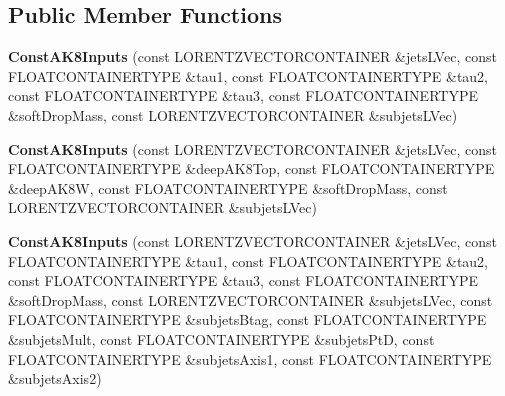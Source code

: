 \subsection*{Public Member Functions}
\begin{DoxyCompactItemize}
\item 
\hypertarget{classttUtility_1_1ConstAK8Inputs_a9b57ae3e1d2882c7c4cc517dd398139b}{{\bfseries Const\-A\-K8\-Inputs} (const L\-O\-R\-E\-N\-T\-Z\-V\-E\-C\-T\-O\-R\-C\-O\-N\-T\-A\-I\-N\-E\-R \&jets\-L\-Vec, const F\-L\-O\-A\-T\-C\-O\-N\-T\-A\-I\-N\-E\-R\-T\-Y\-P\-E \&tau1, const F\-L\-O\-A\-T\-C\-O\-N\-T\-A\-I\-N\-E\-R\-T\-Y\-P\-E \&tau2, const F\-L\-O\-A\-T\-C\-O\-N\-T\-A\-I\-N\-E\-R\-T\-Y\-P\-E \&tau3, const F\-L\-O\-A\-T\-C\-O\-N\-T\-A\-I\-N\-E\-R\-T\-Y\-P\-E \&soft\-Drop\-Mass, const L\-O\-R\-E\-N\-T\-Z\-V\-E\-C\-T\-O\-R\-C\-O\-N\-T\-A\-I\-N\-E\-R \&subjets\-L\-Vec)}\label{classttUtility_1_1ConstAK8Inputs_a9b57ae3e1d2882c7c4cc517dd398139b}

\item 
\hypertarget{classttUtility_1_1ConstAK8Inputs_a926f8b7fae64ae9f0733daeb70597cbc}{{\bfseries Const\-A\-K8\-Inputs} (const L\-O\-R\-E\-N\-T\-Z\-V\-E\-C\-T\-O\-R\-C\-O\-N\-T\-A\-I\-N\-E\-R \&jets\-L\-Vec, const F\-L\-O\-A\-T\-C\-O\-N\-T\-A\-I\-N\-E\-R\-T\-Y\-P\-E \&deep\-A\-K8\-Top, const F\-L\-O\-A\-T\-C\-O\-N\-T\-A\-I\-N\-E\-R\-T\-Y\-P\-E \&deep\-A\-K8\-W, const F\-L\-O\-A\-T\-C\-O\-N\-T\-A\-I\-N\-E\-R\-T\-Y\-P\-E \&soft\-Drop\-Mass, const L\-O\-R\-E\-N\-T\-Z\-V\-E\-C\-T\-O\-R\-C\-O\-N\-T\-A\-I\-N\-E\-R \&subjets\-L\-Vec)}\label{classttUtility_1_1ConstAK8Inputs_a926f8b7fae64ae9f0733daeb70597cbc}

\item 
\hypertarget{classttUtility_1_1ConstAK8Inputs_a897571e7e9ad44c4ef51676778439f59}{{\bfseries Const\-A\-K8\-Inputs} (const L\-O\-R\-E\-N\-T\-Z\-V\-E\-C\-T\-O\-R\-C\-O\-N\-T\-A\-I\-N\-E\-R \&jets\-L\-Vec, const F\-L\-O\-A\-T\-C\-O\-N\-T\-A\-I\-N\-E\-R\-T\-Y\-P\-E \&tau1, const F\-L\-O\-A\-T\-C\-O\-N\-T\-A\-I\-N\-E\-R\-T\-Y\-P\-E \&tau2, const F\-L\-O\-A\-T\-C\-O\-N\-T\-A\-I\-N\-E\-R\-T\-Y\-P\-E \&tau3, const F\-L\-O\-A\-T\-C\-O\-N\-T\-A\-I\-N\-E\-R\-T\-Y\-P\-E \&soft\-Drop\-Mass, const L\-O\-R\-E\-N\-T\-Z\-V\-E\-C\-T\-O\-R\-C\-O\-N\-T\-A\-I\-N\-E\-R \&subjets\-L\-Vec, const F\-L\-O\-A\-T\-C\-O\-N\-T\-A\-I\-N\-E\-R\-T\-Y\-P\-E \&subjets\-Btag, const F\-L\-O\-A\-T\-C\-O\-N\-T\-A\-I\-N\-E\-R\-T\-Y\-P\-E \&subjets\-Mult, const F\-L\-O\-A\-T\-C\-O\-N\-T\-A\-I\-N\-E\-R\-T\-Y\-P\-E \&subjets\-Pt\-D, const F\-L\-O\-A\-T\-C\-O\-N\-T\-A\-I\-N\-E\-R\-T\-Y\-P\-E \&subjets\-Axis1, const F\-L\-O\-A\-T\-C\-O\-N\-T\-A\-I\-N\-E\-R\-T\-Y\-P\-E \&subjets\-Axis2)}\label{classttUtility_1_1ConstAK8Inputs_a897571e7e9ad44c4ef51676778439f59}


\end{DoxyCompactItemize}
